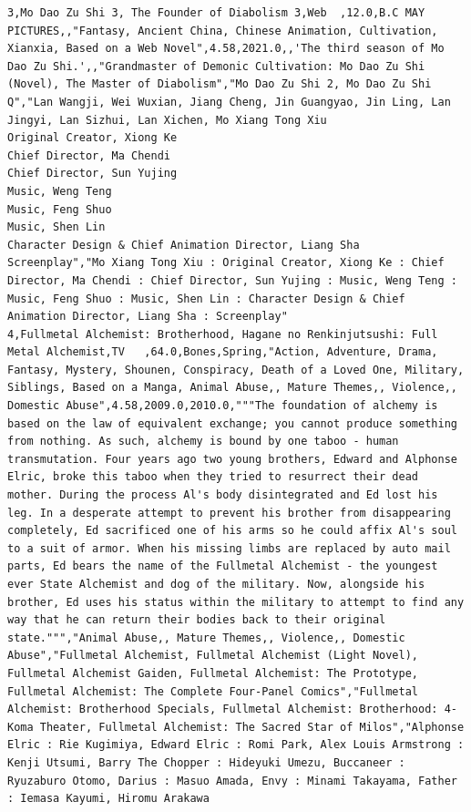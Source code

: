 \begin{verbatim}
3,Mo Dao Zu Shi 3, The Founder of Diabolism 3,Web  ,12.0,B.C MAY PICTURES,,"Fantasy, Ancient China, Chinese Animation, Cultivation, Xianxia, Based on a Web Novel",4.58,2021.0,,'The third season of Mo Dao Zu Shi.',,"Grandmaster of Demonic Cultivation: Mo Dao Zu Shi (Novel), The Master of Diabolism","Mo Dao Zu Shi 2, Mo Dao Zu Shi Q","Lan Wangji, Wei Wuxian, Jiang Cheng, Jin Guangyao, Jin Ling, Lan Jingyi, Lan Sizhui, Lan Xichen, Mo Xiang Tong Xiu
Original Creator, Xiong Ke
Chief Director, Ma Chendi
Chief Director, Sun Yujing
Music, Weng Teng
Music, Feng Shuo
Music, Shen Lin
Character Design & Chief Animation Director, Liang Sha
Screenplay","Mo Xiang Tong Xiu : Original Creator, Xiong Ke : Chief Director, Ma Chendi : Chief Director, Sun Yujing : Music, Weng Teng : Music, Feng Shuo : Music, Shen Lin : Character Design & Chief Animation Director, Liang Sha : Screenplay"
4,Fullmetal Alchemist: Brotherhood, Hagane no Renkinjutsushi: Full Metal Alchemist,TV   ,64.0,Bones,Spring,"Action, Adventure, Drama, Fantasy, Mystery, Shounen, Conspiracy, Death of a Loved One, Military, Siblings, Based on a Manga, Animal Abuse,, Mature Themes,, Violence,, Domestic Abuse",4.58,2009.0,2010.0,"""The foundation of alchemy is based on the law of equivalent exchange; you cannot produce something from nothing. As such, alchemy is bound by one taboo - human transmutation. Four years ago two young brothers, Edward and Alphonse Elric, broke this taboo when they tried to resurrect their dead mother. During the process Al's body disintegrated and Ed lost his leg. In a desperate attempt to prevent his brother from disappearing completely, Ed sacrificed one of his arms so he could affix Al's soul to a suit of armor. When his missing limbs are replaced by auto mail parts, Ed bears the name of the Fullmetal Alchemist - the youngest ever State Alchemist and dog of the military. Now, alongside his brother, Ed uses his status within the military to attempt to find any way that he can return their bodies back to their original state.""","Animal Abuse,, Mature Themes,, Violence,, Domestic Abuse","Fullmetal Alchemist, Fullmetal Alchemist (Light Novel), Fullmetal Alchemist Gaiden, Fullmetal Alchemist: The Prototype, Fullmetal Alchemist: The Complete Four-Panel Comics","Fullmetal Alchemist: Brotherhood Specials, Fullmetal Alchemist: Brotherhood: 4-Koma Theater, Fullmetal Alchemist: The Sacred Star of Milos","Alphonse Elric : Rie Kugimiya, Edward Elric : Romi Park, Alex Louis Armstrong : Kenji Utsumi, Barry The Chopper : Hideyuki Umezu, Buccaneer : Ryuzaburo Otomo, Darius : Masuo Amada, Envy : Minami Takayama, Father : Iemasa Kayumi, Hiromu Arakawa

\end{verbatim}
